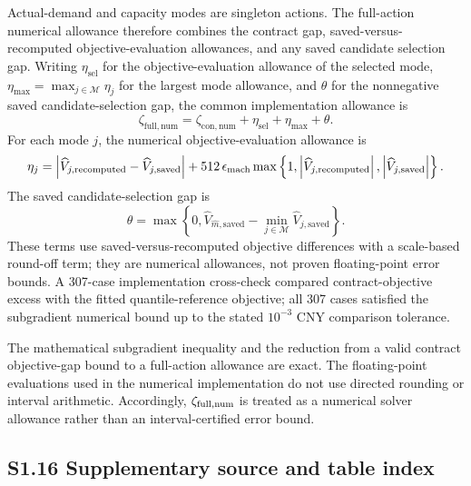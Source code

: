 \documentclass[AMA,Times1COL]{WileyNJDv5}
\begin{document}
Actual-demand and capacity modes are singleton actions. The full-action
numerical allowance therefore combines the contract gap, saved-versus-
recomputed objective-evaluation allowances, and any saved candidate
selection gap. Writing $\eta_{\mathrm{sel}}$ for the objective-evaluation
allowance of the selected mode, $\eta_{\max}=\max_{j\in\mathcal M}\eta_j$
for the largest mode allowance, and $\theta$ for the nonnegative saved
candidate-selection gap, the common implementation allowance is
\[
\zeta_{\mathrm{full,num}}
=\zeta_{\mathrm{con,num}}
+\eta_{\mathrm{sel}}+\eta_{\max}+\theta.
\]
For each mode $j$, the numerical objective-evaluation allowance is
\[
\eta_j
=
\left|\widehat V_{j,\mathrm{recomputed}}-\widehat V_{j,\mathrm{saved}}\right|
+512\,\epsilon_{\rm mach}
\max\left\{1,
\left|\widehat V_{j,\mathrm{recomputed}}\right|,
\left|\widehat V_{j,\mathrm{saved}}\right|
\right\}.
\]
The saved candidate-selection gap is
\[
\theta=\max\left\{0,
\widehat V_{\widehat m,\mathrm{saved}}
-\min_{j\in\mathcal M}\widehat V_{j,\mathrm{saved}}
\right\}.
\]These terms use saved-versus-recomputed objective differences with a
scale-based round-off term; they are numerical allowances, not proven
floating-point error bounds. A 307-case implementation cross-check
compared contract-objective excess with the fitted quantile-reference
objective; all 307 cases satisfied the subgradient numerical bound up
to the stated $10^{-3}$ CNY comparison tolerance.

The mathematical subgradient inequality and the reduction from a valid
contract objective-gap bound to a full-action allowance are exact. The
floating-point evaluations used in the numerical implementation do not
use directed rounding or interval arithmetic. Accordingly,
$\zeta_{\rm full,num}$ is treated as a numerical solver allowance
rather than an interval-certified error bound.


\subsection*{S1.16 Supplementary source and table index}
\end{document}

